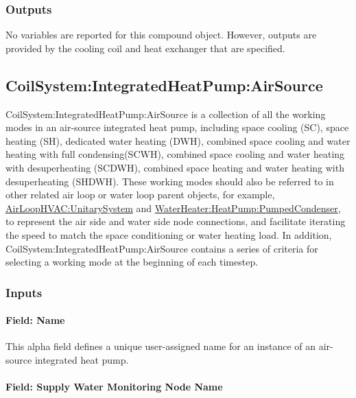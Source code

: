 \subsubsection{Outputs}\label{outputs-21}

No variables are reported for this compound object. However, outputs are provided by the cooling coil and heat exchanger that are specified.

\subsection{CoilSystem:IntegratedHeatPump:AirSource}\label{ASIHPIO}

CoilSystem:IntegratedHeatPump:AirSource is a collection of all the working modes in an air-source integrated heat pump, including space cooling (SC), space heating (SH), dedicated water heating (DWH), combined space cooling and water heating with full condensing(SCWH), combined space cooling and water heating with desuperheating (SCDWH), combined space heating and water heating with desuperheating (SHDWH). These working modes should also be referred to in other related air loop or water loop parent objects, for example, \hyperref[airloophvacunitarysystem]{AirLoopHVAC:UnitarySystem} and \hyperref[waterheaterheatpumppumpedcondenser]{WaterHeater:HeatPump:PumpedCondenser}, to represent the air side and water side node connections, and facilitate iterating the speed to match the space conditioning or water heating load. In addition, CoilSystem:IntegratedHeatPump:AirSource contains a series of criteria for selecting a working mode at the beginning of each timestep.

\subsubsection{Inputs}\label{inputs-ASIHP}

\paragraph{Field: Name}\label{field-name-ASIHP}

This alpha field defines a unique user-assigned name for an instance of an air-source integrated heat pump.

\paragraph{Field: Supply Water Monitoring Node Name}\label{Field-Supply-Water-Monitoring-Node-Name-ASIHP}


